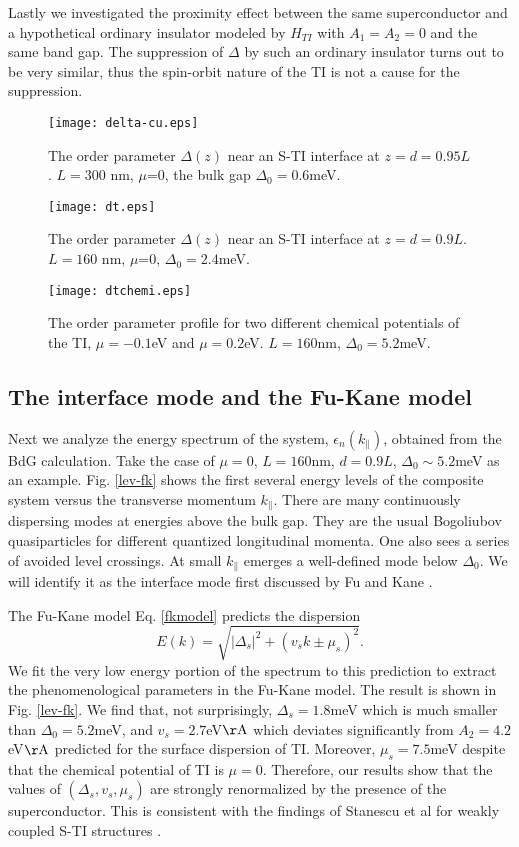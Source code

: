 \documentclass[12pt,twocolumn]{article}
\begin{document}
Lastly we investigated the proximity effect between the same
superconductor and
a hypothetical ordinary insulator modeled by $H_{TI}$ with $A_1=A_2=0$
and the same band gap. The suppression of $\Delta$ by such an 
ordinary insulator turns out to be very similar, thus the spin-orbit nature of the TI is not a cause for the suppression. 
\begin{figure}
\texttt{[image: delta-cu.eps]}
\caption{The order parameter $\Delta(z)$ near an S-TI interface at $z=d=0.95L$. $L=300$ nm, $\mu$=0, the bulk gap $\Delta_0=$0.6meV. }\label{delta-cu}

\texttt{[image: dt.eps]}
\caption{The order parameter $\Delta(z)$ near an S-TI interface at $z=d=0.9L$. $L=160$ nm, $\mu$=0, $\Delta_0= 2.4$meV.}
\label{delta-24}

\texttt{[image: dtchemi.eps]}
\caption{The order parameter profile for two different chemical potentials of the TI, $\mu=-0.1$eV and $\mu=0.2$eV. $L=160$nm, $\Delta_0= 5.2$meV. }\label{delta-chem}
\end{figure}

\subsection{The interface mode and the Fu-Kane model}
Next we analyze the energy spectrum of the system, $\epsilon_n(k_\parallel)$,
obtained from the BdG calculation. 
Take the case of $\mu=0$, $L=160$nm, $d=0.9L$, $\Delta_0\sim 5.2$meV as an example.
Fig. \ref{lev-fk} shows the first several energy levels of the composite
system versus the transverse momentum $k_\parallel$. There are many continuously
dispersing modes at energies above the bulk gap. They are the usual Bogoliubov
quasiparticles for different quantized longitudinal momenta.
One also sees a series of avoided level crossings.
At small $k_\parallel$ emerges a well-defined mode below $\Delta_0$. We will 
identify it as the interface mode first discussed by Fu and Kane \cite{f-k}.

The Fu-Kane model Eq. \eqref{fkmodel} predicts the dispersion 
\begin{equation}
E(k)=\sqrt{|\Delta_s|^2+(v_sk \pm\mu_s)^2}.
\end{equation}
We fit the very low energy portion of the spectrum to this prediction to
extract the phenomenological parameters in the Fu-Kane model. The result
is shown in Fig. \ref{lev-fk}. We find that,
not surprisingly, $\Delta_s=1.8$meV which is much smaller than $\Delta_0=5.2$meV, and 
$v_s=2.7$eV$\mathrm{\AA}$ which deviates significantly 
from $A_2=4.2$eV$\mathrm{\AA}$ predicted for the surface 
dispersion of TI. Moreover, $\mu_s=7.5$meV despite that the chemical potential
of TI is $\mu=0$. Therefore, our results show that the values of $(\Delta_s,v_s,\mu_s)$
are strongly renormalized by the presence of the superconductor. This is consistent 
with the findings of Stanescu et al for weakly coupled S-TI structures \cite{stan}. 
\end{document}
